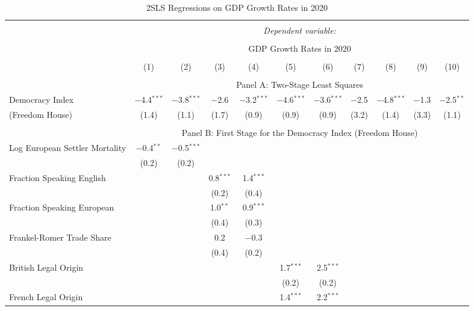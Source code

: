
\begin{table}[!htbp] 
  \caption{2SLS Regressions on GDP Growth Rates in 2020}
  \label{tab:2sls-gdp-restrict-sample} 
  \footnotesize
  \begin{threeparttable}
\begin{tabular}{@{\extracolsep{0pt}}lcccccccccc} 
\\[-1.8ex]\hline 
\hline \\[-1.8ex] 
 & \multicolumn{10}{c}{\textit{Dependent variable:}} \\ 
\cline{2-11} 
\\[-1.8ex] & \multicolumn{10}{c}{GDP Growth Rates in 2020} \\ 
\\[-1.8ex] & (1) & (2) & (3) & (4) & (5) & (6) & (7) & (8) & (9) & (10)\\ 
\hline \\[-1.8ex] 
  & \multicolumn{10}{c}{Panel A: Two-Stage Least Squares} \\
   Democracy Index & $-$4.4$^{***}$ & $-$3.8$^{***}$ & $-$2.6 & $-$3.2$^{***}$ & $-$4.6$^{***}$ & $-$3.6$^{***}$ & $-$2.5 & $-$4.8$^{***}$ & $-$1.3 & $-$2.5$^{**}$ \\ 
 (Freedom House) & (1.4) & (1.1) & (1.7) & (0.9) & (0.9) & (0.9) & (3.2) & (1.4) & (3.3) & (1.1) \\ 
 \hline \\[-1.8ex] 
   & \multicolumn{10}{c}{Panel B: First Stage for the Democracy Index (Freedom House)} \\
  Log European Settler Mortality & $-$0.4$^{**}$ & $-$0.5$^{***}$ &  &  &  &  &  &  &  &  \\ 
  & (0.2) & (0.2) &  &  &  &  &  &  &  &  \\ 
  Fraction Speaking English &  &  & 0.8$^{***}$ & 1.4$^{***}$ &  &  &  &  &  &  \\ 
  &  &  & (0.2) & (0.4) &  &  &  &  &  &  \\ 
  Fraction Speaking European &  &  & 1.0$^{**}$ & 0.9$^{***}$ &  &  &  &  &  &  \\ 
  &  &  & (0.4) & (0.3) &  &  &  &  &  &  \\ 
  Frankel-Romer Trade Share &  &  & 0.2 & $-$0.3 &  &  &  &  &  &  \\ 
  &  &  & (0.4) & (0.2) &  &  &  &  &  &  \\ 
  British Legal Origin &  &  &  &  & 1.7$^{***}$ & 2.5$^{***}$ &  &  &  &  \\ 
  &  &  &  &  & (0.2) & (0.2) &  &  &  &  \\ 
  French Legal Origin &  &  &  &  & 1.4$^{***}$ & 2.2$^{***}$ &  &  &  &  \\ 

\end{tabular}
\end{threeparttable}
\end{table}
